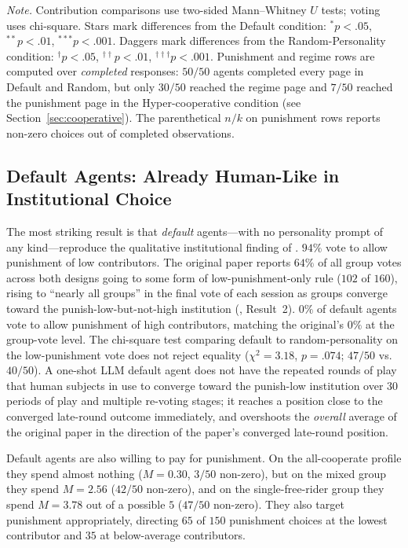 \documentclass[12pt, a4paper]{article}
\begin{document}
\begin{table}[H]
\medskip
\footnotesize
\textit{Note.} Contribution comparisons use two-sided Mann--Whitney $U$ tests; voting uses chi-square. Stars mark differences from the Default condition: $^{*}p<.05$, $^{**}p<.01$, $^{***}p<.001$. Daggers mark differences from the Random-Personality condition: $^{\dagger}p<.05$, $^{\dagger\dagger}p<.01$, $^{\dagger\dagger\dagger}p<.001$. Punishment and regime rows are computed over \emph{completed} responses: $50/50$ agents completed every page in Default and Random, but only $30/50$ reached the regime page and $7/50$ reached the punishment page in the Hyper-cooperative condition (see Section~\ref{sec:cooperative}). The parenthetical $n/k$ on punishment rows reports non-zero choices out of completed observations.
\end{table}

\subsection{Default Agents: Already Human-Like in Institutional Choice}

The most striking result is that \emph{default} agents---with no personality prompt of any kind---reproduce the qualitative institutional finding of \citet{ertan2009who}. $94\%$ vote to allow punishment of low contributors. The original paper reports $64\%$ of all group votes across both designs going to some form of low-punishment-only rule ($102$ of $160$), rising to ``nearly all groups'' in the final vote of each session as groups converge toward the punish-low-but-not-high institution (\citealt{ertan2009who}, Result~2). $0\%$ of default agents vote to allow punishment of high contributors, matching the original's $0\%$ at the group-vote level. The chi-square test comparing default to random-personality on the low-punishment vote does not reject equality ($\chi^2 = 3.18$, $p = .074$; $47/50$ vs.\ $40/50$). A one-shot LLM default agent does not have the repeated rounds of play that human subjects in \citet{ertan2009who} use to converge toward the punish-low institution over $30$ periods of play and multiple re-voting stages; it reaches a position close to the converged late-round outcome immediately, and overshoots the \emph{overall} average of the original paper in the direction of the paper's converged late-round position.

Default agents are also willing to pay for punishment. On the all-cooperate profile they spend almost nothing ($M=0.30$, $3/50$ non-zero), but on the mixed group they spend $M=2.56$ ($42/50$ non-zero), and on the single-free-rider group they spend $M=3.78$ out of a possible $5$ ($47/50$ non-zero). They also target punishment appropriately, directing $65$ of $150$ punishment choices at the lowest contributor and $35$ at below-average contributors.
\end{document}
